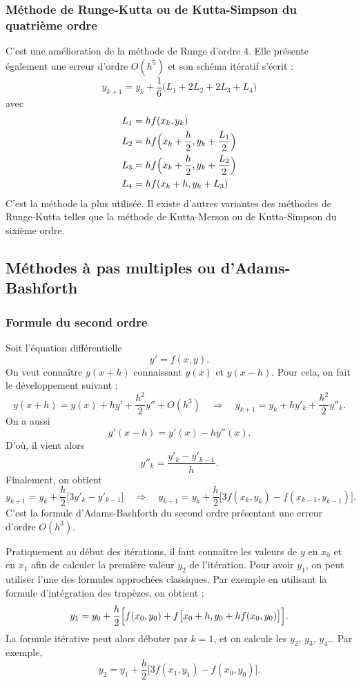 \subsubsection{Méthode de Runge-Kutta ou de Kutta-Simpson du quatrième ordre}

C'est une amélioration de la méthode de Runge d'ordre 4. Elle présente
également une erreur d'ordre $O(h^5)$ et son schéma itératif s'écrit :
\[
  y_{k+1} = y_k + \frac{1}{6}\bigl(L_1 + 2L_2 + 2L_3 + L_4\bigr)
\]
avec
\[
  \begin{aligned}
    L_1 &= hf(x_k, y_k)\\
    L_2 &= hf\Bigl(x_k + \frac{h}{2}, y_k + \frac{L_1}{2}\Bigr)\\
    L_3 &= hf\Bigl(x_k + \frac{h}{2}, y_k + \frac{L_2}{2}\Bigr)\\
    L_4 &= hf(x_k + h, y_k + L_3)
  \end{aligned}
\]
C'est la méthode la plus utilisée. Il existe d'autres variantes des méthodes de
Runge-Kutta telles que la méthode de Kutta-Merson ou de Kutta-Simpson du
sixième ordre.

\subsection{Méthodes à pas multiples ou d'Adams-Bashforth}

\subsubsection{Formule du second ordre}

Soit l'équation différentielle
\[
  y' = f(x, y) .
\]
On veut connaître $y(x+h)$ connaissant $y(x)$ et $y(x-h)$. Pour cela, on fait
le développement suivant :
\[
  y(x+h) = y(x) + hy' + \frac{h^2}{2}y'' + O(h^3)
  \quad\Longrightarrow\quad
  y_{k+1} = y_k + hy'_k + \frac{h^2}{2}y''_k .
\]
On a aussi
\[
  y'(x-h) = y'(x) - hy''(x) .
\]
D'où, il vient alors
\[
  y''_k = \frac{y'_k - y'_{k-1}}{h} .
\]
Finalement, on obtient
\[
  y_{k+1} = y_k + \frac{h}{2}\bigl[3y'_k - y'_{k-1}\bigr]
  \quad\Longrightarrow\quad
  y_{k+1} = y_k + \frac{h}{2}\bigl[3f(x_k, y_k) - f(x_{k-1}, y_{k-1})\bigr].
\]
C'est la formule d'Adams-Bashforth du second ordre présentant une erreur
d'ordre $O(h^3)$.

Pratiquement au début des itérations, il faut connaître les valeurs de $y$ en
$x_0$ et en $x_1$ afin de calculer la première valeur $y_2$ de l'itération.
Pour avoir $y_1$, on peut utiliser l'une des formules approchées classiques.
Par exemple en utilisant la formule d'intégration des trapèzes, on obtient :
\[
  y_1 = y_0 + \frac{h}{2}\Bigl[f(x_0, y_0) + f\bigl[x_0 + h, y_0 + hf(x_0, y_0)\bigr]\Bigr].
\]
La formule itérative peut alors débuter par $k = 1$, et on calcule les $y_2$,
$y_3$, $y_4$\dots{} Par exemple,
\[
  y_2 = y_1 + \frac{h}{2}\bigl[3f(x_1, y_1) - f(x_0, y_0)\bigr].
\]


